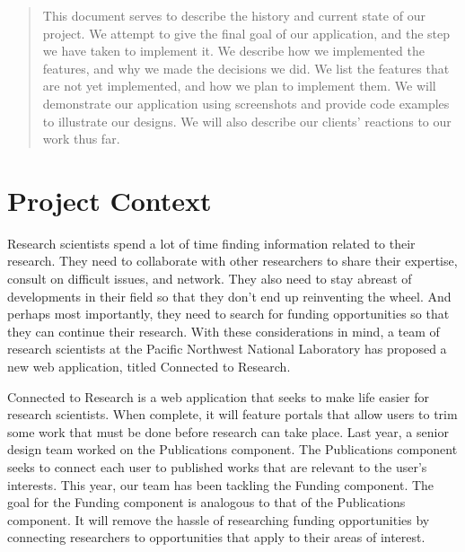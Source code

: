 \documentclass[onecolumn]{IEEEtran}
\begin{document}
\begin{titlepage}
    \begin{minipage}{1.0\textwidth}
        \begin{abstract}
            This document serves to describe the history and current state of our project. We attempt to give the final goal of our application, and the step we have taken to implement it. We describe how we implemented the features, and why we made the decisions we did. We list the features that are not yet implemented, and how we plan to implement them. We will demonstrate our application using screenshots and provide code examples to illustrate our designs. We will also describe our clients' reactions to our work thus far.        
        \end{abstract}
    \end{minipage}

\end{titlepage}

\tableofcontents
\pagebreak	%

\section{Project Context}
Research scientists spend a lot of time finding information related to their research. They need to collaborate with other researchers to share their expertise, consult on difficult issues, and network. They also need to stay abreast of developments in their field so that they don't end up reinventing the wheel. And perhaps most importantly, they need to search for funding opportunities so that they can continue their research. With these considerations in mind, a team of research scientists at the Pacific Northwest National Laboratory has proposed a new web application, titled Connected to Research. 

Connected to Research is a web application that seeks to make life easier for research scientists. When complete, it will feature portals that allow users to trim some work that must be done before research can take place. Last year, a senior design team worked on the Publications component. The Publications component seeks to connect each user to published works that are relevant to the user's interests. This year, our team has been tackling the Funding component. The goal for the Funding component is analogous to that of the Publications component. It will remove the hassle of researching funding opportunities by connecting researchers to opportunities that apply to their areas of interest.
\end{document}
